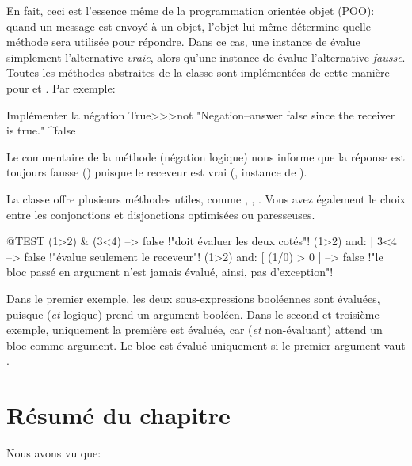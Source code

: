 \documentclass[a4paper,10pt,twoside]{book}
\begin{document}
En fait, ceci est l'essence même de la programmation orientée
objet (POO): quand un message est envoyé à un objet, l'objet
lui-même détermine quelle méthode sera utilisée pour
répondre. Dans ce cas, une instance de   évalue
simplement l'alternative \emph{vraie}, alors qu'une instance de
 évalue l'alternative \emph{fausse}. Toutes les méthodes 
abstraites de la classe  sont implémentées de cette 
manière pour  et . Par exemple:

\begin{method}{Implémenter la négation}
True>>>not
    "Negation--answer false since the receiver is true."
    ^false
\end{method}

Le commentaire de la méthode  (négation logique) nous informe que
la réponse est toujours fausse () puisque le receveur est
vrai (, instance de ).

La classe  offre plusieurs méthodes utiles, comme , , . Vous avez également le choix entre les conjonctions et disjonctions optimisées ou paresseuses.

\begin{code}{@TEST}
(1>2) & (3<4)              --> false    !"doit évaluer les deux cotés"!
(1>2) and: [ 3<4 ]        --> false    !"évalue seulement le receveur"!
(1>2) and: [ (1/0) > 0 ] --> false    !"le bloc passé en argument n'est jamais évalué, ainsi, pas d'exception"!
\end{code}

Dans le premier exemple, les deux sous-expressions booléennes sont
évaluées, puisque  
(\emph{et} logique) 
prend un argument booléen.
Dans le second et troisième exemple, uniquement la première est
évaluée, car  
(\emph{et} non-évaluant) 
attend un bloc comme argument. Le  bloc est évalué uniquement si le premier argument vaut .


\section{Résumé du chapitre}
Nous avons vu que:
\end{document}

